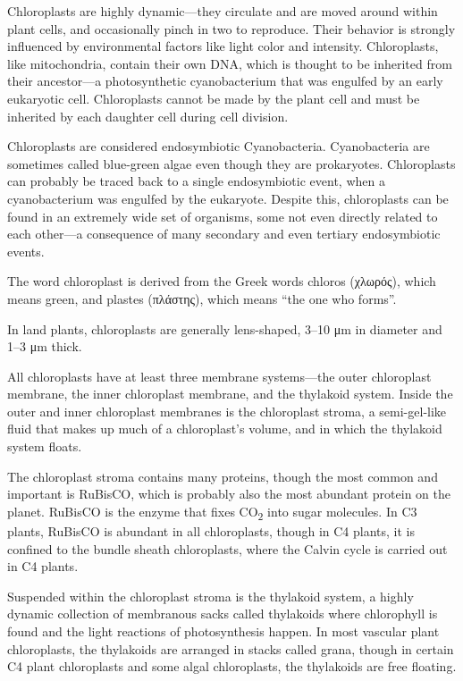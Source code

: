 Chloroplasts are highly dynamic---they circulate and are moved around within plant cells, and occasionally pinch in two to reproduce. Their behavior is strongly influenced by environmental factors like light color and intensity. Chloroplasts, like mitochondria, contain their own DNA, which is thought to be inherited from their ancestor---a photosynthetic cyanobacterium that was engulfed by an early eukaryotic cell. Chloroplasts cannot be made by the plant cell and must be inherited by each daughter cell during cell division.

Chloroplasts are considered endosymbiotic Cyanobacteria. Cyanobacteria are sometimes called blue-green algae even though they are prokaryotes. Chloroplasts can probably be traced back to a single endosymbiotic event, when a cyanobacterium was engulfed by the eukaryote. Despite this, chloroplasts can be found in an extremely wide set of organisms, some not even directly related to each other---a consequence of many secondary and even tertiary endosymbiotic events.

The word chloroplast is derived from the Greek words chloros (χλωρός), which means green, and plastes (πλάστης), which means ``the one who forms''.

In land plants, chloroplasts are generally lens-shaped, 3--10 μm in diameter and 1--3 μm thick.

All chloroplasts have at least three membrane systems---the outer chloroplast membrane, the inner chloroplast membrane, and the thylakoid system. Inside the outer and inner chloroplast membranes is the chloroplast stroma, a semi-gel-like fluid that makes up much of a chloroplast's volume, and in which the thylakoid system floats.

The chloroplast stroma contains many proteins, though the most common and important is RuBisCO, which is probably also the most abundant protein on the planet. RuBisCO is the enzyme that fixes CO\textsubscript{2} into sugar molecules. In C3 plants, RuBisCO is abundant in all chloroplasts, though in C4 plants, it is confined to the bundle sheath chloroplasts, where the Calvin cycle is carried out in C4 plants.

Suspended within the chloroplast stroma is the thylakoid system, a highly dynamic collection of membranous sacks called thylakoids where chlorophyll is found and the light reactions of photosynthesis happen. In most vascular plant chloroplasts, the thylakoids are arranged in stacks called grana, though in certain C4 plant chloroplasts and some algal chloroplasts, the thylakoids are free floating.

